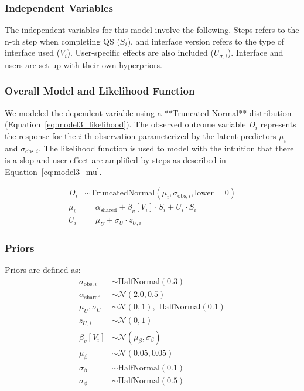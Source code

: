 \subsubsection{Independent Variables}
The independent variables for this model involve the following. Steps refers to the n-th step when completing QS ($S_i$), and interface version refers to the type of interface used ($V_i$). User-specific effects are also included ($U_{\sigma,i}$). Interface and users are set up with their own hyperpriors.

\subsubsection{Overall Model and Likelihood Function}
We modeled the dependent variable using a **Truncated Normal** distribution (Equation~\ref{eq:model3_likelihood}). The observed outcome variable \( D_i \) represents the response for the \( i \)-th observation parameterized by the latent predictors \( \mu_i \) and \( \sigma_{\text{obs},i} \). The likelihood function is used to model with the intuition that there is a slop and user effect are amplified by steps as described in Equation~\ref{eq:model3_mu}.


\begin{align}
    D_i &\sim \text{TruncatedNormal}(\mu_i, \sigma_{\text{obs},i}, \text{lower}=0) \label{eq:model3_likelihood} \\
    \mu_i &= \alpha_{\text{shared}} + \beta_v[V_i] \cdot S_i + U_i \cdot S_i \label{eq:model3_mu} \\
    U_i &= \mu_{U} + \sigma_{U} \cdot z_{U,i} \label{eq:model3_user_mu}
\end{align}

\subsubsection{Priors}
Priors are defined as:
\begin{align}
    \sigma_{\text{obs},i} &\sim \text{HalfNormal}(0.3) \label{eq:model3_prior_sigma} \\
    \alpha_{\text{shared}} &\sim \mathcal{N}(2.0, 0.5) \label{eq:model3_prior_shared} \\
    \mu_{U}, \sigma_{U} &\sim \mathcal{N}(0, 1), \text{ HalfNormal}(0.1) \label{eq:model3_prior_user} \\
    z_{U,i} &\sim \mathcal{N}(0, 1) \label{eq:model3_prior_z} \\
    \beta_v[V_i] &\sim \mathcal{N}(\mu_{\beta}, \sigma_{\beta}) \label{eq:model3_prior_beta} \\
    \mu_{\beta} &\sim \mathcal{N}(0.05, 0.05) \\
    \sigma_{\beta} &\sim \text{HalfNormal}(0.1) \\
    \sigma_{\phi} &\sim \text{HalfNormal}(0.5) \label{eq:model3_prior_sigma_phi}    
\end{align}

